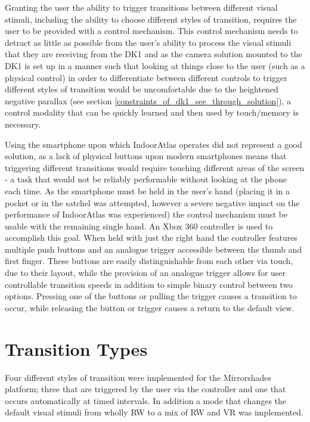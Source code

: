 Granting the user the ability to trigger transitions between different visual stimuli, including the ability to choose different styles of transition, requires the user to be provided with a control mechanism. This control mechanism needs to detract as little as possible from the user's ability to process the visual stimuli that they are receiving from the DK1 and as the camera solution mounted to the DK1 is set up in a manner such that looking at things close to the user (such as a physical control) in order to differentiate between different controls to trigger different styles of transition would be uncomfortable due to the heightened negative parallax (see section \ref{constraints_of_dk1_see_through_solution}), a control modality that can be quickly learned and then used by touch/memory is necessary.

Using the smartphone upon which IndoorAtlas operates did not represent a good solution, as a lack of physical buttons upon modern smartphones means that triggering different transitions would require touching different areas of the screen - a task that would not be reliably performable without looking at the phone each time. As the smartphone must be held in the user's hand (placing it in a pocket or in the satchel was attempted, however a severe negative impact on the performance of IndoorAtlas was experienced) the control mechanism must be usable with the remaining single hand. An Xbox 360 controller is used to accomplish this goal. When held with just the right hand the controller features multiple push buttons and an analogue trigger accessible between the thumb and first finger. These buttons are easily distinguishable from each other via touch, due to their layout, while the provision of an analogue trigger allows for user controllable transition speeds in addition to simple binary control between two options. Pressing one of the buttons or pulling the trigger causes a transition to occur, while releasing the button or trigger causes a return to the default view.


\section{Transition Types}

Four different styles of transition were implemented for the Mirrorshades platform; three that are triggered by the user via the controller and one that occurs automatically at timed intervals. In addition a mode that changes the default visual stimuli from wholly RW to a mix of RW and VR was implemented.

